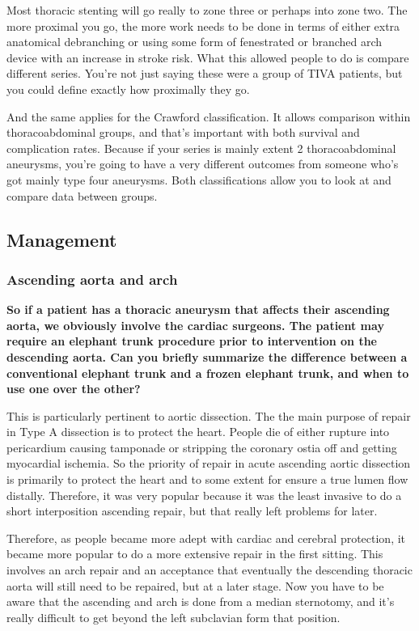 \documentclass[
]{book}
\begin{document}
Most thoracic stenting will go really to zone three or perhaps into zone
two. The more proximal you go, the more work needs to be done in terms
of either extra anatomical debranching or using some form of fenestrated
or branched arch device with an increase in stroke risk. What this
allowed people to do is compare different series. You're not just saying
these were a group of TIVA patients, but you could define exactly how
proximally they go.

And the same applies for the Crawford classification. It allows
comparison within thoracoabdominal groups, and that's important with
both survival and complication rates. Because if your series is mainly
extent 2 thoracoabdominal aneurysms, you're going to have a very
different outcomes from someone who's got mainly type four aneurysms.
Both classifications allow you to look at and compare data between
groups.

\hypertarget{management-28}{%
\subsection{Management}\label{management-28}}

\hypertarget{ascending-aorta-and-arch}{%
\subsubsection{Ascending aorta and arch}\label{ascending-aorta-and-arch}}

\textbf{So if a patient has a thoracic aneurysm that affects their ascending
aorta, we obviously involve the cardiac surgeons. The patient may
require an elephant trunk procedure prior to intervention on the
descending aorta. Can you briefly summarize the difference between a
conventional elephant trunk and a frozen elephant trunk, and when to use
one over the other?}

This is particularly pertinent to aortic dissection. The the main
purpose of repair in Type A dissection is to protect the heart. People
die of either rupture into pericardium causing tamponade or stripping
the coronary ostia off and getting myocardial ischemia. So the priority
of repair in acute ascending aortic dissection is primarily to protect
the heart and to some extent for ensure a true lumen flow distally.
Therefore, it was very popular because it was the least invasive to do a
short interposition ascending repair, but that really left problems for
later.

Therefore, as people became more adept with cardiac and cerebral
protection, it became more popular to do a more extensive repair in the
first sitting. This involves an arch repair and an acceptance that
eventually the descending thoracic aorta will still need to be repaired,
but at a later stage. Now you have to be aware that the ascending and
arch is done from a median sternotomy, and it's really difficult to get
beyond the left subclavian form that position.
\end{document}
